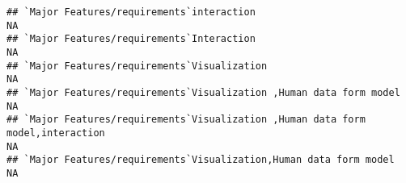 \documentclass[]{article}
\begin{document}
\begin{verbatim}
## `Major Features/requirements`interaction                                                                                                                                                                                                                                                                                                                                                                                                                                              NA
## `Major Features/requirements`Interaction                                                                                                                                                                                                                                                                                                                                                                                                                                              NA
## `Major Features/requirements`Visualization                                                                                                                                                                                                                                                                                                                                                                                                                                            NA
## `Major Features/requirements`Visualization ,Human data form model                                                                                                                                                                                                                                                                                                                                                                                                                     NA
## `Major Features/requirements`Visualization ,Human data form model,interaction                                                                                                                                                                                                                                                                                                                                                                                                         NA
## `Major Features/requirements`Visualization,Human data form model                                                                                                                                                                                                                                                                                                                                                                                                                      NA

\end{verbatim}
\end{document}
